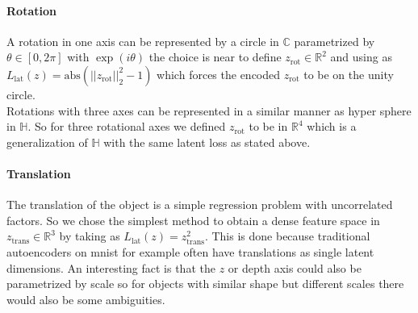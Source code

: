 \documentclass[10pt,a4paper]{article}
\newcommand{\rot}{\ensuremath{\text{rot}\xspace}}
\newcommand{\trans}{\ensuremath{\text{trans}\xspace}}
\begin{document}
\paragraph{Rotation} A rotation in one axis can be represented by a circle in $\mathbb{C}$ parametrized by $\theta \in [0, 2 \pi]$ with $\exp(i \theta)$ the choice  is near to define $z_{\rot} \in \mathbb{R}^2$ and using as $L_{\text{lat}}(z) = \text{abs} (||z_{\rot}||_2^2 -1)$ which forces the encoded $z_{\rot}$ to be on the unity circle. \\ 
Rotations with three axes can be represented in a similar manner as hyper sphere in $\mathbb{H}$. So for three rotational axes we defined $z_{\rot}$ to be in $\mathbb{R}^4$ which is a generalization of $\mathbb{H}$ with the same latent loss as stated above.\\
\paragraph{Translation} The translation of the object is a simple regression problem with uncorrelated factors. So we chose the simplest method to obtain a dense feature space in $z_{\trans} \in \mathbb{R}^3$ by taking as $L_{\text{lat}}(z) = z_{\trans}^2$. This is done because traditional autoencoders on mnist for example often have translations as single latent dimensions. An interesting fact is that the $z$ or depth axis could also be parametrized by scale so for objects with similar shape but different scales there would also be some ambiguities. 

\newpage
\end{document}
